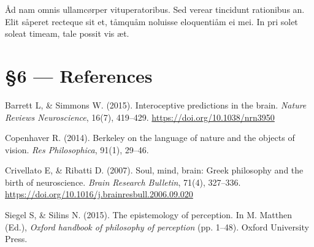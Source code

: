 \documentclass[
  12pt,
  british,
  a4paper,
]{article}
\begin{document}
Åd nam omnis ullamcørper vituperatoribus. Sed verear tincidunt
rationibus an. Elit såperet recteque sit et, tåmquåm noluisse
eloquentiåm ei mei. In pri solet soleat timeam, tale possit vis æt.

\hypertarget{references}{%
\section*{§6 --- References}\label{references}}

\hypertarget{refs}{}
\leavevmode\hypertarget{ref-barrett2015}{}%
Barrett L, \& Simmons W. (2015). Interoceptive predictions in the brain.
\emph{Nature Reviews Neuroscience}, 16(7), 419--429.
\url{https://doi.org/10.1038/nrn3950}

\leavevmode\hypertarget{ref-copenhaver2014}{}%
Copenhaver R. (2014). Berkeley on the language of nature and the objects
of vision. \emph{Res Philosophica}, 91(1), 29--46.

\leavevmode\hypertarget{ref-crivellato2007}{}%
Crivellato E, \& Ribatti D. (2007). Soul, mind, brain: Greek philosophy
and the birth of neuroscience. \emph{Brain Research Bulletin}, 71(4),
327--336. \url{https://doi.org/10.1016/j.brainresbull.2006.09.020}

\leavevmode\hypertarget{ref-siegel2015}{}%
Siegel S, \& Silins N. (2015). The epistemology of perception. In M.
Matthen (Ed.), \emph{Oxford handbook of philosophy of perception} (pp.
1--48). Oxford University Press.
\end{document}
